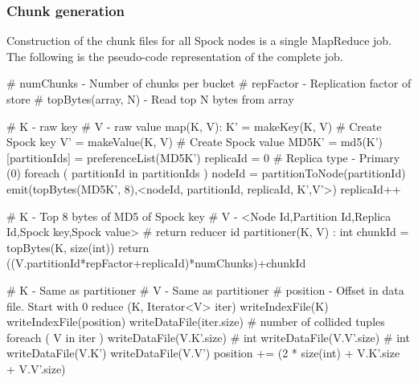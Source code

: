\documentclass[twocolumn]{article}
\newcommand{\projectname}{Spock}
\begin{document}

\subsubsection{Chunk generation}
\label{sec:read_only:chunk_generation}

Construction of the chunk files for all \projectname{} nodes is a single MapReduce job. The following is the pseudo-code representation of the complete job. 

\scriptsize
\label{MapReduce for Chunk generation}
\begin{verbatimtab}
# numChunks - Number of chunks per bucket
# repFactor - Replication factor of store
# topBytes(array, N) - Read top N bytes from array

# K - raw key
# V - raw value
map(K, V):
  K' = makeKey(K, V)     	# Create Spock key
  V' = makeValue(K, V)   	# Create Spock value
  MD5K' = md5(K')
  [partitionIds] = preferenceList(MD5K')
  replicaId = 0			# Replica type - Primary (0)
  foreach ( partitionId in partitionIds )
    nodeId = partitionToNode(partitionId)
    emit(topBytes(MD5K', 8),<nodeId, partitionId, replicaId, K',V'>) 
    replicaId++     

# K - Top 8 bytes of MD5 of Spock key
# V - <Node Id,Partition Id,Replica Id,Spock key,Spock value>
# return reducer id
partitioner(K, V) : int
  chunkId = topBytes(K, size(int)) %
  return ((V.partitionId*repFactor+replicaId)*numChunks)+chunkId
 
# K - Same as partitioner
# V - Same as partitioner
# position - Offset in data file. Start with 0
reduce (K, Iterator<V> iter)
  writeIndexFile(K)
  writeIndexFile(position)
  writeDataFile(iter.size)   # number of collided tuples
  foreach ( V in iter )
    writeDataFile(V.K'.size) # int
    writeDataFile(V.V'.size) # int
    writeDataFile(V.K')
    writeDataFile(V.V')
    position += (2 * size(int) + V.K'.size + V.V'.size)
\end{verbatimtab}
\normalsize
\end{document}

